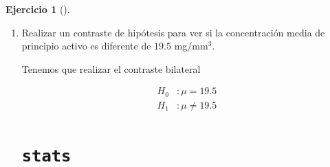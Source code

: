 \documentclass[
  a4paper,
]{scrreport}
\newenvironment{Shaded}{\begin{snugshade}}{\end{snugshade}}
\newcommand{\AttributeTok}[1]{\textcolor[rgb]{0.40,0.45,0.13}{#1}}
\newcommand{\FloatTok}[1]{\textcolor[rgb]{0.68,0.00,0.00}{#1}}
\newcommand{\FunctionTok}[1]{\textcolor[rgb]{0.28,0.35,0.67}{#1}}
\newcommand{\NormalTok}[1]{\textcolor[rgb]{0.00,0.23,0.31}{#1}}
\newcommand{\SpecialCharTok}[1]{\textcolor[rgb]{0.37,0.37,0.37}{#1}}
\theoremstyle{definition}
\newtheorem{exercise}{Ejercicio}[chapter]
\theoremstyle{remark}
\begin{document}
\begin{exercise}[]
\begin{enumerate}
\begin{tcolorbox}
  Como el p-valor del contraste es \(0.9451\) que es mucho mayor que el
  riesgo \(\alpha=0.05\), no rechazamos la hipótesis nula.

  Obsérvese que el valor de la media muestral es \(17.96\) que está muy
  cerca del valor que establece la hipótesis nula, por lo que sería una
  locura rechazar la hipótesis nula con esta muestra.

  \end{tcolorbox}
\item
  Realizar un contraste de hipótesis para ver si la concentración media
  de principio activo es diferente de \(19.5\) mg/mm\(^3\).

  \begin{tcolorbox}[enhanced jigsaw, colframe=quarto-callout-tip-color-frame, toprule=.15mm, bottomtitle=1mm, breakable, opacitybacktitle=0.6, toptitle=1mm, colback=white, bottomrule=.15mm, title=\textcolor{quarto-callout-tip-color}{\faLightbulb}\hspace{0.5em}{Solución}, arc=.35mm, left=2mm, titlerule=0mm, rightrule=.15mm, coltitle=black, leftrule=.75mm, opacityback=0, colbacktitle=quarto-callout-tip-color!10!white]

  Tenemos que realizar el contraste bilateral

  \begin{align*}
  H_0 &: \mu=19.5\\
  H_1 &: \mu\neq 19.5
  \end{align*}

  \section{\texorpdfstring{\texttt{stats}}{stats}}

\begin{Shaded}
\end{Shaded}


\end{tcolorbox}
\end{enumerate}
\end{exercise}
\end{document}

